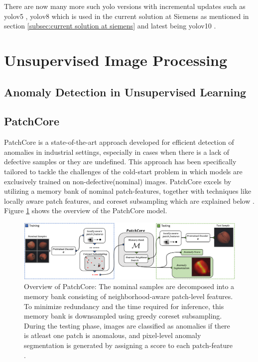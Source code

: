 There are now many more such \gls{yolo} versions with incremental updates such as \gls{yolo}v5 \cite{yolov5}, \gls{yolo}v8 \cite{Ultralytics2024} which is used in the current solution at Siemens as mentioned in section \ref{subsec:current solution at siemens} and latest being \gls{yolo}v10 \cite{Ultralytics2024v10}.

\section{Unsupervised Image Processing}

\subsection{Anomaly Detection in Unsupervised Learning}

\subsection{PatchCore}
\label{subsec:patchcore}

PatchCore is a state-of-the-art approach developed for efficient detection of anomalies in industrial settings, especially in cases when there is a lack of defective samples or they are undefined. This approach has been specifically tailored to tackle the challenges of the cold-start problem in which models are exclusively trained on non-defective(nominal) images. PatchCore excels by utilizing a memory bank of nominal patch-features, together with techniques like locally aware patch features, and coreset subsampling which are explained below \cite{roth2022totalrecallindustrialanomaly}. Figure \ref{fig:patchcore architecture} shows the overview of the PatchCore model.

\begin{figure}[ht!]
    \centering
    \includegraphics[width=1.1\textwidth]{Rohit_Master_Thesis//Images/patchcore_architecture_figure.png}
    \caption{Overview of PatchCore: The nominal samples are decomposed into a memory bank consisting of neighborhood-aware patch-level features. To minimize redundancy and the time required for inference, this memory bank is downsampled using greedy coreset subsampling. During the testing phase, images are classified as anomalies if there is atleast one patch is anomalous, and pixel-level anomaly segmentation is generated by assigning a score to each patch-feature \cite{roth2022totalrecallindustrialanomaly}.}
    \label{fig:patchcore architecture}
\end{figure}

